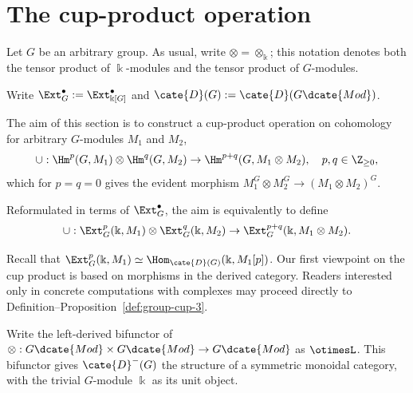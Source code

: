 
\section{The cup-product operation}\label{sec:cup-product}
\hypertarget{o014.aljabr2.chapter6.cup-product}{ }

Let $G$ be an arbitrary group. As usual, write
$\otimes=\otimes_{\Bbbk}$; this notation denotes both the tensor product of
$\Bbbk$-modules and the tensor product of $G$-modules.

\begin{convention}
	Write $\Ext_G^\bullet:=\Ext_{\Bbbk[G]}^\bullet$ and
	$\cate{D}(G):=\cate{D}(G\dcate{Mod})$.
\end{convention}

The aim of this section is to construct a cup-product operation on cohomology
for arbitrary $G$-modules $M_1$ and $M_2$,
\[ \cup: \Hm^p(G, M_1) \otimes \Hm^q(G, M_2) \to \Hm^{p+q}(G, M_1 \otimes M_2), \quad p, q \in \Z_{\geq 0}, \]
which for $p=q=0$ gives the evident morphism
$M_1^G\otimes M_2^G\to(M_1\otimes M_2)^G$.

Reformulated in terms of $\Ext_G^\bullet$, the aim is equivalently to define
\[ \cup: \Ext^p_G(\Bbbk, M_1) \otimes \Ext^q_G(\Bbbk, M_2) \to \Ext_G^{p+q}(\Bbbk, M_1 \otimes M_2). \]

Recall that
$\Ext^p_G(\Bbbk,M_1)\simeq\Hom_{\cate{D}(G)}(\Bbbk,M_1[p])$. Our first
viewpoint on the cup product is based on morphisms in the derived category.
Readers interested only in concrete computations with complexes may proceed
directly to Definition--Proposition~\ref{def:group-cup-3}.

\begin{definition}
	Write the left-derived bifunctor of
	$\otimes:G\dcate{Mod}\times G\dcate{Mod}\to G\dcate{Mod}$ as
	$\otimesL$. This bifunctor gives $\cate{D}^-(G)$ the structure of a
	symmetric monoidal category, with the trivial $G$-module $\Bbbk$ as its
	unit object.
\end{definition}

